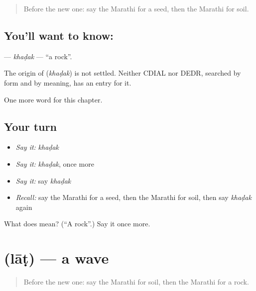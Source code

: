 \label{lesson:MR-C140-khadak}



\begin{quote}
Before the new one: say the Marathi for a seed, then the Marathi for soil.
\end{quote}

\subsection*{You'll want to know: }
\textbf{} — \emph{khaḍak} — \textquotedblleft{}a rock\textquotedblright{}.

\begin{cousinweb}
The origin of \textbf{} (\emph{khaḍak}) is not settled. Neither CDIAL nor DEDR, searched by form and by meaning, has an entry for it.
\end{cousinweb}

\begin{grammarlens}[title={What you've built}]
One more word for this chapter.
\end{grammarlens}

\subsection*{Your turn}
\begin{itemize}
\raggedright
  \item \emph{Say it:} \emph{khaḍak}
  \item \emph{Say it:} \emph{khaḍak}, once more
  \item \emph{Say it:} say \emph{khaḍak}
  \item \emph{Recall:} say the Marathi for a seed, then the Marathi for soil, then say \emph{khaḍak} again
\end{itemize}

\begin{tcolorbox}[breakable,colback=teal!4,colframe=teal!35!black,title={Before you move on}]
What does  mean? (\textquotedblleft{}A rock\textquotedblright{}.) Say it once more.
\end{tcolorbox}
\section[\texorpdfstring{\mr{लाट} (lāṭ)}{लाट (lāṭ)}]{ (lāṭ) — a wave}

\label{lesson:MR-C140-lat}



\begin{quote}
Before the new one: say the Marathi for soil, then the Marathi for a rock.
\end{quote}

